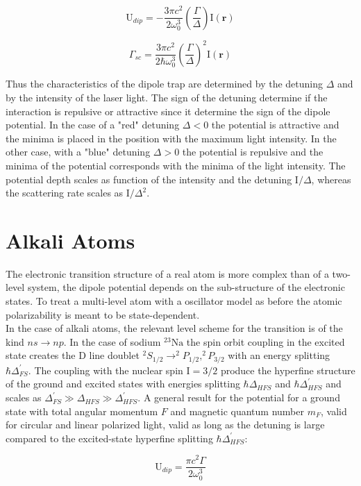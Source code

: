 \documentclass[../thesis.tex]{subfiles}
\begin{document}
\begin{equation}
\text{U}_{dip} = - \frac{3 \pi c^2}{2 \omega_0^3} \left( \frac{\Gamma}{\Delta} \right) \text{I}(\textbf{r})
\end{equation}

\begin{equation}
\Gamma_{sc} =  \frac{3 \pi c^2}{2 \hbar \omega_0^3} \left( \frac{\Gamma}{\Delta} \right)^2 \text{I}(\textbf{r})
\end{equation}

Thus the characteristics of the dipole trap are determined by the detuning $\Delta$ and by the intensity of the laser light.  The sign of the detuning determine if the interaction is repulsive or attractive since it determine the sign of the dipole potential. In the case of a "red" detuning $\Delta < 0$ the potential is attractive and the minima is placed in the position with the maximum light intensity. In the other case, with a "blue" detuning $\Delta > 0$ the potential is repulsive and the minima of the potential corresponds with the minima of the light intensity. The potential depth scales as function of the intensity and the detuning $\text{I}/ \Delta$, whereas the scattering rate scales as $\text{I}/ \Delta^2$.

\section{Alkali Atoms}

The electronic transition structure of a real atom is more complex than of a two-level system, the dipole potential depends on the sub-structure of the electronic states. To treat a multi-level atom with a oscillator model as before the atomic polarizability is meant to be state-dependent.\\
In the case of alkali atoms, the relevant level scheme for the transition is of the kind $ns \rightarrow np$. In the case of sodium $^{23} \text{Na}$ the spin orbit coupling in the excited state creates the D line doublet $^2 S_{1/2} \rightarrow ^2 P_{1/2}, ^2 P_{3/2}$ with an energy splitting $\hbar \Delta^\prime_{FS}$. The coupling with the nuclear spin $\text{I} = 3/2$ produce the hyperfine structure of the ground and excited states with energies splitting $\hbar \Delta_{HFS}$ and $\hbar \Delta^\prime_{HFS}$ and scales as $\Delta^\prime_{FS} \gg \Delta_{HFS} \gg \Delta^\prime_{HFS}$. A general result for the potential for a ground state with total angular momentum $F$ and magnetic quantum number $m_F$, valid for circular and linear polarized light, valid as long as the detuning is large compared to the excited-state hyperfine splitting $\hbar \Delta^\prime_{HFS}$:

\begin{equation}
\text{U}_{dip} = \frac{\pi c^2 \Gamma}{2 \omega_0^3} 
\end{equation}
\end{document}

